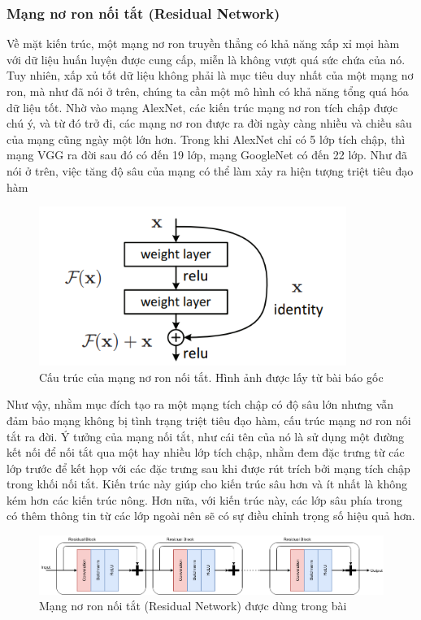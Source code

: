 \subsubsection{Mạng nơ ron nối tắt (Residual Network)}

Về mặt kiến trúc, một mạng nơ ron truyền thẳng có khả năng xấp xỉ mọi hàm với dữ liệu huấn luyện được cung cấp, miễn là không vượt quá sức chứa của nó. Tuy nhiên, xấp xủ tốt dữ liệu không phải là mục tiêu duy nhất của một mạng nơ ron, mà như đã nói ở trên, chúng ta cần một mô hình có khả năng tổng quá hóa dữ liệu tốt. Nhờ vào mạng AlexNet, các kiến trúc mạng nơ ron tích chập được chú ý, và từ đó trở đi, các mạng nơ ron được ra đời ngày càng nhiều và chiều sâu của mạng cũng ngày một lớn hơn. Trong khi AlexNet chỉ có 5 lớp tích chập, thì mạng VGG ra đời sau đó có đến 19 lớp, mạng GoogleNet có đến 22 lớp. Như đã nói ở trên, việc tăng độ sâu của mạng có thể làm xảy ra hiện tượng triệt tiêu đạo hàm

\begin{figure}[H]
    \centering
    \includegraphics[width=10cm]{./content/materials/residual_orig.png}
    \caption{Cấu trúc của mạng nơ ron nối tắt. Hình ảnh được lấy từ bài báo gốc \cite{residual}}
\end{figure}

Như vậy, nhằm mục đích tạo ra một mạng tích chập có độ sâu lớn nhưng vẫn đảm bảo mạng không bị tình trạng triệt tiêu đạo hàm, cấu trúc mạng nơ ron nối tắt ra đời. Ý tưởng của mạng nối tắt, như cái tên của nó là sử dụng một đường kết nối để nối tắt qua một hay nhiều lớp tích chập, nhằm đem đặc trưng từ các lớp trước để kết họp với các đặc trưng sau khi được rút trích bởi mạng tích chập trong khối nối tắt. Kiến trúc này giúp cho kiến trúc sâu hơn và ít nhất là không kém hơn các kiến trúc nông. Hơn nữa, với kiến trúc này, các lớp sâu phía trong có thêm thông tin từ các lớp ngoài nên sẽ có sự điều chỉnh trọng số hiệu quả hơn.

\begin{figure}[H]
    \centering
    \includegraphics[width=15cm]{./content/materials/residual.png}
    \caption{Mạng nơ ron nối tắt (Residual Network) được dùng trong bài}
\end{figure}

